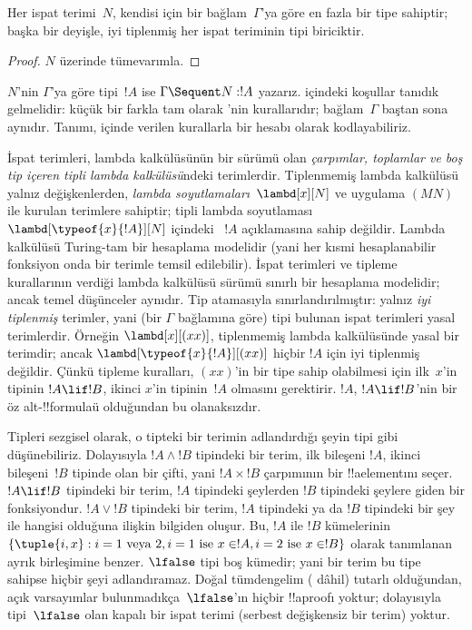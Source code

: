 \begin{prop}
Her ispat terimi~$N$, kendisi için bir bağlam~$\Gamma$'ya göre en fazla
bir tipe sahiptir; başka bir deyişle, iyi tiplenmiş her ispat teriminin tipi
biriciktir.
\end{prop}

\begin{proof}
  $N$ üzerinde tümevarımla.
\end{proof}

$N$'nin $\Gamma$'ya göre tipi~$!A$ ise $\Gamma \Sequent N : !A$ yazarız.
 içindeki koşullar tanıdık gelmelidir: küçük bir farkla tam
olarak 'nin kurallarıdır; bağlam~$\Gamma$ baştan sona aynıdır.
Tanımı,  içinde verilen kurallarla bir  hesabı
olarak kodlayabiliriz.


İspat terimleri, lambda kalkülüsünün bir sürümü olan \emph{çarpımlar,
toplamlar ve boş tip içeren tipli lambda kalkülüsü}ndeki terimlerdir.
Tiplenmemiş lambda kalkülüsü yalnız değişkenlerden, \emph{lambda
soyutlamaları}~$\lambd[x][N]$ ve uygulama $(MN)$ ile kurulan terimlere
sahiptir; tipli lambda soyutlaması $\lambd[\typeof{x}{!A}][N]$ içindeki
~$!A$ açıklamasına sahip değildir. Lambda kalkülüsü Turing-tam bir hesaplama
modelidir (yani her kısmi hesaplanabilir fonksiyon onda bir terimle temsil
edilebilir). İspat terimleri ve tipleme kurallarının verdiği lambda
kalkülüsü sürümü sınırlı bir hesaplama modelidir; ancak temel düşünceler
aynıdır. Tip atamasıyla sınırlandırılmıştır: yalnız \emph{iyi tiplenmiş}
terimler, yani (bir $\Gamma$ bağlamına göre) tipi bulunan ispat terimleri
yasal terimlerdir. Örneğin $\lambd[x][(xx)]$, tiplenmemiş lambda
kalkülüsünde yasal bir terimdir; ancak $\lambd[\typeof{x}{!A}][(xx)]$ hiçbir
$!A$ için iyi tiplenmiş değildir. Çünkü tipleme kuralları, $(xx)$'in bir
tipe sahip olabilmesi için ilk~$x$'in tipinin $!A \lif !B$, ikinci $x$'in
tipinin~$!A$ olmasını gerektirir. $!A$, $!A \lif !B$'nin bir öz
alt-!!{formula}{}ü olduğundan bu olanaksızdır.

Tipleri sezgisel olarak, o tipteki bir terimin adlandırdığı şeyin tipi gibi
düşünebiliriz. Dolayısıyla $!A \land !B$ tipindeki bir terim, ilk bileşeni
$!A$, ikinci bileşeni~$!B$ tipinde olan bir çifti, yani $!A \times !B$
çarpımının bir !!a{element}{}ını seçer. $!A \lif !B$ tipindeki bir terim,
$!A$ tipindeki şeylerden $!B$ tipindeki şeylere giden bir fonksiyondur.
$!A \lor !B$ tipindeki bir terim, $!A$ tipindeki ya da $!B$ tipindeki bir
şey ile hangisi olduğuna ilişkin bilgiden oluşur. Bu, $!A$ ile $!B$
kümelerinin $\{\tuple{i,x} : i = 1 \text{ veya } 2, i = 1 \text{ ise }
x \in !A, i=2 \text{ ise } x \in !B\}$ olarak tanımlanan ayrık birleşimine
benzer. $\lfalse$ tipi boş kümedir; yani bir terim bu tipe sahipse hiçbir
şeyi adlandıramaz. Doğal tümdengelim ( dâhil) tutarlı olduğundan,
açık varsayımlar bulunmadıkça~$\lfalse$'ın hiçbir !!a{proof}{}ı yoktur;
dolayısıyla tipi~$\lfalse$ olan kapalı bir ispat terimi (serbest değişkensiz
bir terim) yoktur.

